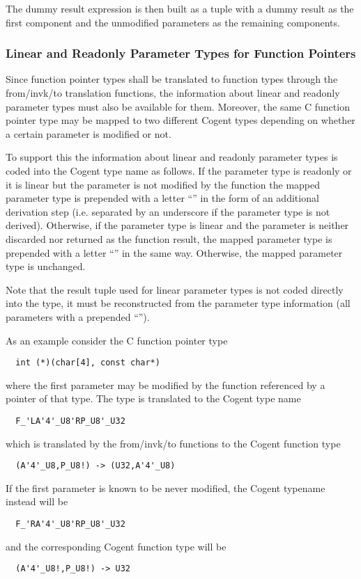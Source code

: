 The dummy result expression is then built as a tuple with a dummy result as the first component and the unmodified
parameters as the remaining components.

\subsubsection{Linear and Readonly Parameter Types for Function Pointers}

Since function pointer types shall be translated to function types through the from/invk/to translation functions, the 
information about linear and readonly parameter types must also be available for them. Moreover, the same C function
pointer type may be mapped to two different Cogent types depending on whether a certain parameter is modified or not. 

To support this the information about linear and readonly parameter types is coded into the Cogent type name as follows.
If the parameter type is readonly or it is linear but the parameter is not modified by the function the mapped
parameter type is prepended with a letter ``'' in the form of an additional derivation step (i.e. separated by 
an underscore if the parameter type is not derived). Otherwise, if the parameter type is linear and the parameter is 
neither discarded nor returned as the function result, the mapped parameter type is prepended with a 
letter ``'' in the same way. Otherwise, the mapped parameter type is unchanged.

Note that the result tuple used for linear parameter types is not coded directly into the type, it must be 
reconstructed from the parameter type information (all parameters with a prepended ``''). 

As an example consider the C function pointer type
\begin{verbatim}
  int (*)(char[4], const char*)
\end{verbatim}
where the first parameter may be modified by the function referenced by a pointer of that type.
The type is translated to the Cogent type name
\begin{verbatim}
  F_'LA'4'_U8'RP_U8'_U32
\end{verbatim}
which is translated by the from/invk/to functions to the Cogent function type
\begin{verbatim}
  (A'4'_U8,P_U8!) -> (U32,A'4'_U8)
\end{verbatim}
If the first parameter is known to be never modified, the Cogent typename instead will be
\begin{verbatim}
  F_'RA'4'_U8'RP_U8'_U32
\end{verbatim}
and the corresponding Cogent function type will be
\begin{verbatim}
  (A'4'_U8!,P_U8!) -> U32
\end{verbatim}

